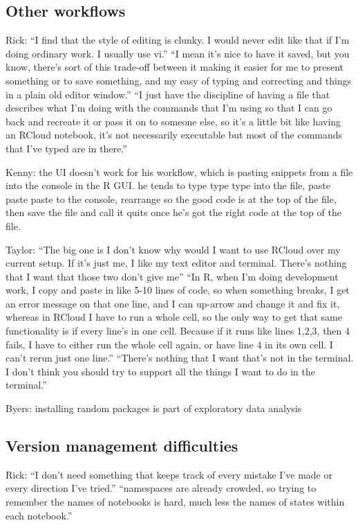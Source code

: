 \subsection{Other workflows}
Rick: ``I find that the style of editing is clunky. I would never edit like that if I'm doing ordinary work. I usually use vi.'' ``I mean it's nice to have it saved, but you know, there's sort of this trade-off between it making it easier for me to present something or to save something, and my easy of typing and correcting and things in a plain old editor window.'' ``I just have the discipline of having a file that describes what I'm doing with the commands that I'm using so that I can go back and recreate it or pass it on to someone else, so it's a little bit like having an RCloud notebook, it's not necessarily executable but most of the commands that I've typed are in there.''

Kenny: the UI doesn't work for his workflow, which is pasting snippets from a file into the console in the R GUI.  he tends to type type type into the file, paste paste paste to the console, rearrange so the good code is at the top of the file, then save the file and call it quits once he's got the right code at the top of the file.

Taylor: ``The big one is I don't know why would I want to use RCloud over my current setup. If it's just me, I like my text editor and terminal. There's nothing that I want that those two don't give me'' ``In R, when I'm doing development work, I copy and paste in like 5-10 lines of code, so when something breaks, I get an error message on that one line, and I can up-arrow and change it and fix it, whereas in RCloud I have to run a whole cell, so the only way to get that same functionality is if every line's in one cell. Because if it runs like lines 1,2,3, then 4 fails, I have to either run the whole cell again, or have line 4 in its own cell. I can't rerun just one line.'' ``There's nothing that I want that's not in the terminal. I don't think you should try to support all the things I want to do in the terminal.''

Byers: installing random packages is part of exploratory data analysis


\subsection{Version management difficulties}
Rick: ``I don't need something that keeps track of every mistake I've made or every direction I've tried.” ``namespaces are already crowded, so trying to remember the names of notebooks is hard, much less the names of states within each notebook.''


